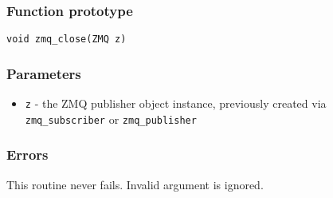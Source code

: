 \subsubsection*{Function prototype}
\begin{verbatim}
void zmq_close(ZMQ z)
\end{verbatim}

\subsubsection*{Parameters}
\begin{itemize}[noitemsep]
\item \texttt{z} - the ZMQ publisher object instance, previously created via \texttt{zmq\_subscriber} or \texttt{zmq\_publisher}
\end{itemize}

\subsubsection*{Errors}
This routine never fails. Invalid argument is ignored.
